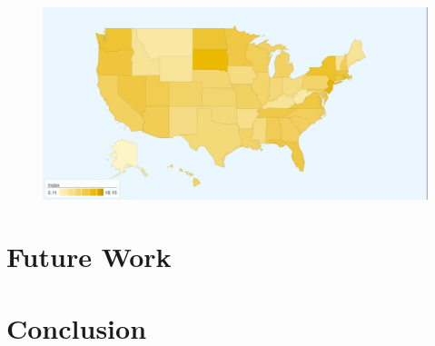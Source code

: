 \documentclass{sig-alternate-10pt}
\begin{document}
\begin{figure}
\centering
        \includegraphics[width=0.9\linewidth]{figs/map.pdf}
  \caption{}
  \label{fig:services-hist}
\end{figure}

\section{Future Work}
\label{sec:future-work} 



\section{Conclusion}
\label{sec:conclusion} 
\end{document}
